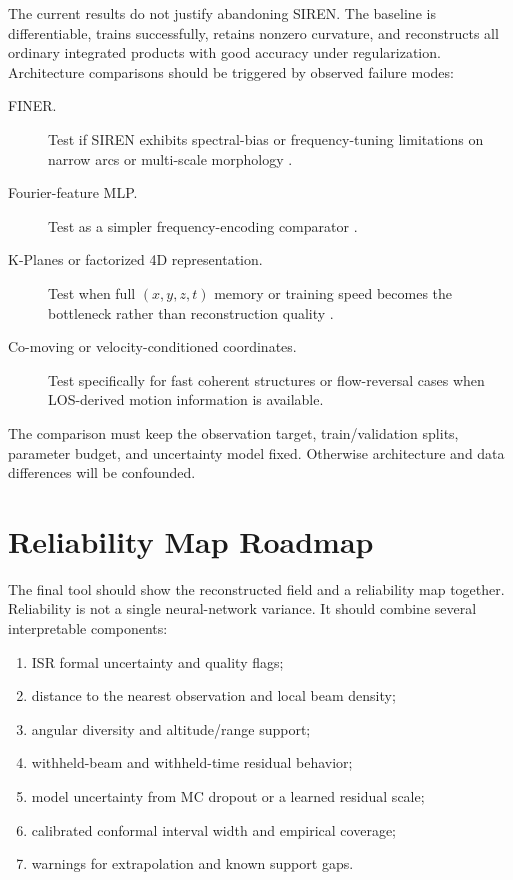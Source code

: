 \documentclass[11pt]{article}
\begin{document}
The current results do not justify abandoning SIREN. The baseline is differentiable, trains successfully,
retains nonzero curvature, and reconstructs all ordinary integrated products with good accuracy under
regularization. Architecture comparisons should be triggered by observed failure modes:
\begin{description}
  \item[FINER.] Test if SIREN exhibits spectral-bias or frequency-tuning limitations on narrow arcs or
  multi-scale morphology \cite{Liu2023FINER}.
  \item[Fourier-feature MLP.] Test as a simpler frequency-encoding comparator
  \cite{Tancik2020Fourier}.
  \item[K-Planes or factorized 4D representation.] Test when full $(x,y,z,t)$ memory or training speed becomes
  the bottleneck rather than reconstruction quality \cite{FridovichKeil2023KPlanes}.
  \item[Co-moving or velocity-conditioned coordinates.] Test specifically for fast coherent structures or
  flow-reversal cases when LOS-derived motion information is available.
\end{description}

The comparison must keep the observation target, train/validation splits, parameter budget, and uncertainty
model fixed. Otherwise architecture and data differences will be confounded.

\section{Reliability Map Roadmap}

The final tool should show the reconstructed field and a reliability map together. Reliability is not a
single neural-network variance. It should combine several interpretable components:
\begin{enumerate}
  \item ISR formal uncertainty and quality flags;
  \item distance to the nearest observation and local beam density;
  \item angular diversity and altitude/range support;
  \item withheld-beam and withheld-time residual behavior;
  \item model uncertainty from MC dropout or a learned residual scale;
  \item calibrated conformal interval width and empirical coverage;
  \item warnings for extrapolation and known support gaps.
\end{enumerate}
\end{document}
